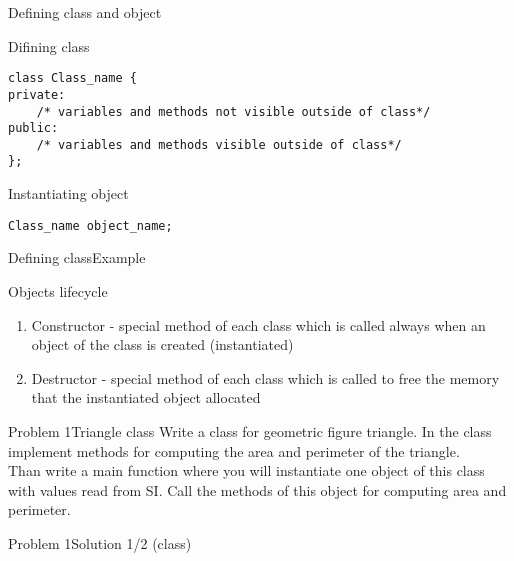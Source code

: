 
\begin{frame}[fragile]{Defining class and object}
\begin{exampleblock}{Difining class}
\begin{lstlisting}
class Class_name {
private:
    /* variables and methods not visible outside of class*/ 
public:
    /* variables and methods visible outside of class*/ 
};
\end{lstlisting}
\end{exampleblock}
\begin{exampleblock}{Instantiating object}
\begin{lstlisting}
Class_name object_name;
\end{lstlisting}
\end{exampleblock}
\end{frame}

\begin{frame}[fragile,shrink=10]{Defining class}{Example}

\end{frame}

\begin{frame}{Objects lifecycle}
\begin{enumerate}
  \item Constructor - special method of each class which is called always when
  an object of the class is created (instantiated)
  \item Destructor - special method of each class which is called to free
  the memory that the instantiated object allocated
\end{enumerate}
\end{frame}

\begin{frame}{Problem 1}{Triangle class}
Write a class for geometric figure triangle. In the class implement methods for
computing the area and perimeter of the triangle.\\
Than write a main function where you will instantiate one object of this class
with values read from SI. Call the methods of this object for computing area
and perimeter.
\end{frame}

\begin{frame}[fragile]{Problem 1}{Solution 1/2 (class)}

\end{frame}

